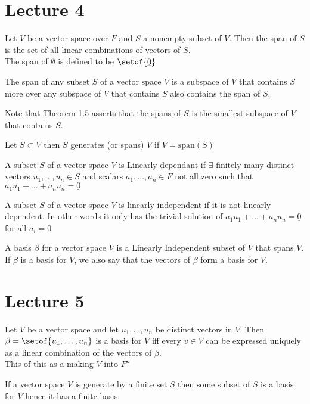 \documentclass[answers,12pt,addpoints]{exam}
\begin{document}
\section{Lecture 4}
\begin{definition}
    Let $V$ be a vector space over $F$ and $S$ a nonempty subset of $V$. Then the span of $S$ is the set of all linear combinations of vectors of $S$.\\
    The span of $\emptyset$ is defined to be $\setof{\underline{0}}$
\end{definition}
\begin{theorem}[Theorem 1.5]
    The span of any subset $S$ of a vector space $V$ is a subspace of $V$ that contains $S$ more over any subspace of $V$ that contains $S$ also contains the span of $S$.
\end{theorem}
Note that Theorem 1.5 asserts that the spans of $S$ is the smallest subspace of $V$ that contains $S$.
\begin{definition}
    Let $S \subset V$ then $S$ generates (or spans) $V$ if $V = \text{span}(S)$
\end{definition}
\begin{definition}
    A subset $S$ of a vector space $V$ is Linearly dependant if $\exists$ finitely many distinct vectors $u_1, \dots, u_n \in S$ and scalars $a_1, \dots, a_n \in F$ not all zero such that $a_1u_1 + \dots + a_nu_n = \underline{0}$
\end{definition}
\begin{definition}
    A subset $S$ of a vector space $V$ is linearly independent if it is not linearly dependent. In other words it only has the trivial solution of $a_1u_1 + \dots + a_nu_n = \underline{0}$ for all $a_i = 0$
\end{definition}
\begin{definition}
    A basis $\beta$ for a vector space $V$ is a Linearly Independent subset of $V$ that spans $V$. If $\beta$ is a basis for $V$, we also say that the vectors of $\beta$ form a basis for $V$.
\end{definition}

\section{Lecture 5}
\begin{theorem}[Theorem 1.8]
    Let $V$ be a vector space and let $u_1, \dots, u_n$ be distinct vectors in $V$. Then $\beta = \setof{u_1, \dots, u_n}$ is a basis for $V$ iff every $v \in V$ can be expressed uniquely as a linear combination of the vectors of $\beta$.\\
    This of this as a making $V$ into $F^n$
\end{theorem}
\begin{theorem}[Theorem 1.9]
    If a vector space $V$ is generate by a finite set $S$ then some subset of $S$ is a basis for $V$ hence it has a finite basis.
\end{theorem}
\end{document}
